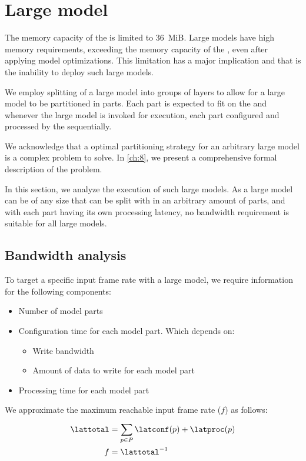 \section{Large model}
The memory capacity of the \graicore{} is limited to \SI{36}{MiB}.
Large models have high memory requirements, exceeding the memory capacity of the \graicore{}, even after applying model optimizations.
This limitation has a major implication and that is the inability to deploy such large models.

We employ splitting of a large model into groups of layers to allow for a large model to be partitioned in parts.
Each part is expected to fit on the \graicore{} and whenever the large model is invoked for execution, each part configured and processed by the \graicore{} sequentially.

We acknowledge that a optimal partitioning strategy for an arbitrary large model is a complex problem to solve.
In \cref{ch:8}, we present a comprehensive formal description of the problem.


In this section, we analyze the execution of such large models.
As a large model can be of any size that can be split with in an arbitrary amount of parts, and with each part having its own processing latency, no bandwidth requirement is suitable for all large models.

\subsection{Bandwidth analysis}
To target a specific input frame rate with a large model, we require information for the following components:
\begin{itemize}
    \item Number of model parts
    \item Configuration time for each model part. Which depends on:
    \begin{itemize}
        \item Write bandwidth
        \item Amount of data to write for each model part
    \end{itemize}
    \item Processing time for each model part
\end{itemize}

We approximate the maximum reachable input frame rate ($f$) as follows:
\begin{align*} 
    \lattotal &= \sum_{p \in P}^{}{\latconf(p) + \latproc(p)} \\
    f &= \lattotal^{-1}
\end{align*}


